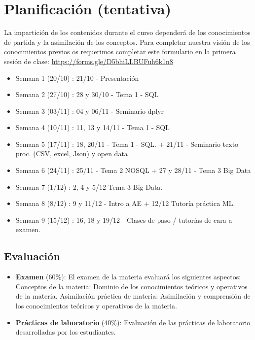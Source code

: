\documentclass[
]{book}
\theoremstyle{break}
\theoremstyle{nonumberplain}
\begin{document}
\section{Planificación (tentativa)}\label{planificaciuxf3n-tentativa}

La impartición de los contenidos durante el curso dependerá de los conocimientos de partida y la asimilación de los
conceptos. Para completar nuestra visión de los conocimientos previos os requerimos completar este formulario en la primera sesión de clase: \url{https://forms.gle/D5bhiLLBUFuh6k1n8}

\begin{itemize}
\item
  Semana 1 (20/10) : 21/10 - Presentación
\item
  Semana 2 (27/10) : 28 y 30/10 - Tema 1 - SQL
\item
  Semana 3 (03/11) : 04 y 06/11 - Seminario dplyr
\item
  Semana 4 (10/11) : 11, 13 y 14/11 - Tema 1 - SQL
\item
  Semana 5 (17/11) : 18, 20/11 - Tema 1 - SQL. + 21/11 - Seminario texto proc. (CSV, excel, Json) y open data
\item
  Semana 6 (24/11) : 25/11 - Tema 2 NOSQL + 27 y 28/11 - Tema 3 Big Data
\item
  Semana 7 (1/12) : 2, 4 y 5/12 Tema 3 Big Data.
\item
  Semana 8 (8/12) : 9 y 11/12 - Intro a AE + 12/12 Tutoría práctica ML.
\item
  Semana 9 (15/12) : 16, 18 y 19/12 - Clases de paso / tutorías de cara a examen.
\end{itemize}

\subsection{Evaluación}\label{evaluaciuxf3n}

\begin{itemize}
\item
  \textbf{Examen} (60\%): El examen de la materia evaluará los siguientes aspectos:
  Conceptos de la materia: Dominio de los conocimientos teóricos y operativos de la materia.
  Asimilación práctica de materia: Asimilación y comprensión de los conocimientos teóricos y operativos de la materia.
\item
  \textbf{Prácticas de laboratorio} (40\%): Evaluación de las prácticas de laboratorio desarrolladas por los estudiantes.
\end{itemize}
\end{document}
